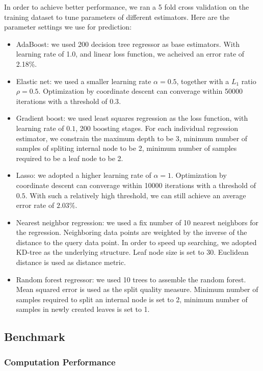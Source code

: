 In order to achieve better performance, we ran a 5 fold cross validation on the
training dataset to tune parameters of different estimators. Here are the
parameter settings we use for prediction:
\begin{itemize}
   \item AdaBoost: we used 200 decision tree regressor as base estimators. With
      learning rate of 1.0, and linear loss function, we acheived an error rate
      of 2.18\%.
   \item Elastic net: we used a smaller learning rate $\alpha=0.5$, together
      with a $L_1$ ratio $\rho=0.5$. Optimization by coordinate descent can
      converage within 50000 iterations with a threshold of $0.3$.
   \item Gradient boost: we used least squares regression as the loss function,
      with learning rate of $0.1$, 200 boosting stages. For each individual
      regression estimator, we constrain the maximum depth to be 3, minimum
      number of samples of spliting internal node to be 2, minimum number of
      samples required to be a leaf node to be 2.
   \item Lasso: we adopted a higher learning rate of $\alpha=1$. Optimization
      by coordinate descent can converage within 10000 iterations with a
      threshold of $0.5$. With such a relatively high threshold, we can still
      achieve an average error rate of $2.03\%$.
   \item Nearest neighbor regression: we used a fix number of 10 nearest
      neighbors for the regression. Neighboring data points are weighted by
      the inverse of the distance to the query data point. In order to speed up
      searching, we adopted KD-tree as the underlying structure. Leaf node size
      is set to 30. Euclidean distance is used as distance metric.
   \item Random forest regressor: we used 10 trees to assemble the random
      forest. Mean squared error is used as the split quality measure. Minimum
      number of samples required to split an internal node is set to 2, minimum
      number of samples in newly created leaves is set to 1.
\end{itemize}

\subsection{Benchmark}
\label{sub:benchmark}

\subsubsection{Computation Performance}
\label{ssub:computation_performance}



